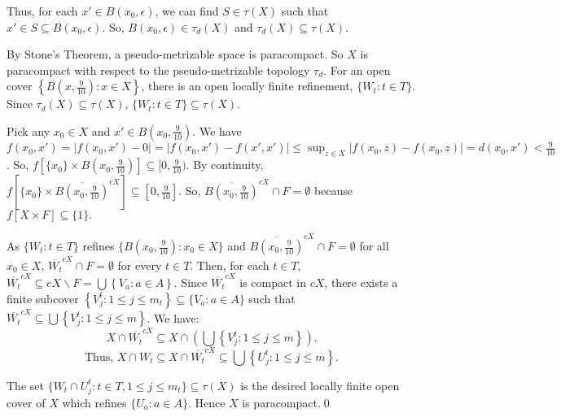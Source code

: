 \documentclass{article}
\begin{document}
\vskip 10pt


Thus, for each $x' \in B(x_0,\epsilon)$, we can find $S\in \tau(X)$ such that $x'\in S \subseteq B(x_0,\epsilon).$ So, $B(x_0, \epsilon)\in \tau_d(X)$ and $\tau_d(X) \subseteq \tau(X)$.

\vskip 10pt


By Stone's Theorem, a pseudo-metrizable space is paracompact. So $X$ is paracompact with respect to the pseudo-metrizable topology $\tau_d$. For an open cover $\left\{B(x,\frac{9}{10}): x\in X\right\}$, there is an open locally finite refinement, $\{W_t : t\in T\}.$ Since $\tau_d(X) \subseteq \tau(X)$, $\{W_t: t\in T\} \subseteq \tau(X)$. 


\vskip 10pt
Pick any $x_0\in X$ and $x' \in B(x_0,\frac{9}{10})$. We have $f(x_0, x')= |f(x_0,x')-0|=|f(x_0,x')-f(x',x')| \leq \sup_{z\in X}\left|f(x_0,z)-f(x_0,z)\right|= d(x_0,x') < \frac{9}{10}$. 
So, $f\left[\{x_0\} \times B(x_0, \frac{9}{10})\right] \subseteq [0,\frac{9}{10})$. By continuity, $f\left[\{x_0\}\times \overline{B(x_0,\frac{9}{10})}^{cX}\right] \subseteq [0,\frac{9}{10}].$ So, $\overline{B(x_0,\frac{9}{10})}^{cX} \cap F =\emptyset$ because $f\left[X\times F\right] \subseteq \{1\}.$

\vskip 15pt

As $\{W_t:  t\in T\}$ refines $\{B(x_0,\frac{9}{10}): x_0\in X\}$ and $\overline{B(x_0,\frac{9}{10})}^{cX} \cap F =\emptyset$ for all $x_0\in X$, $\overline{W_t}^{cX} \cap F = \emptyset$ for every $t \in T$. Then, for each $t\in T$, 
$\overline{W_t}^{cX} \subseteq cX\backslash F = \bigcup \left\{V_a: a\in A\right\}$. Since $\overline{W_t}^{cX}$ is compact in $cX$, there exists a finite subcover $\left\{V_j^t: 1\leq j\leq m_t\right\} \subseteq \{V_a: a \in A\}$ such that $\overline{W_t}^{cX} \subseteq \bigcup \left\{V_j^t: 1\leq j \leq m \right\}$. We have: 
$$X\cap \overline{W_t}^{cX} \subseteq X\cap (\bigcup \left\{V_j^t: 1\leq j \leq m\right\}).$$
$$\mbox{Thus, }X\cap W_t \subseteq X\cap \overline{W_t}^{cX} \subseteq \bigcup \left\{U_j^t: 1\leq j\leq m\right\}.$$

\vskip 20pt

The set $\{W_t \cap U_j^t: t\in T, 1 \leq j \leq m_t \} \subseteq \tau(X)$ is the desired locally finite open cover of $X$ which refines $\{U_a: a \in A\}$. Hence $X$ is paracompact.\qed









\newpage
\end{document}
